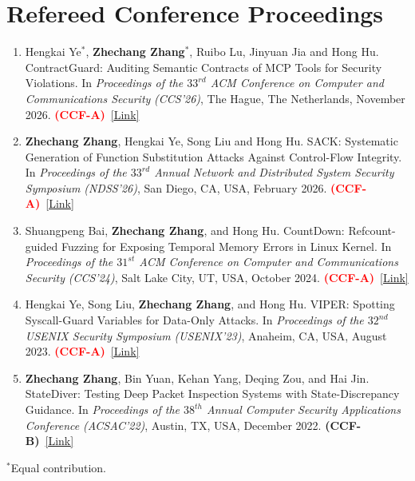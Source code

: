 \documentclass[letterpaper,10.8pt]{article}
\begin{document}
\section{Refereed Conference Proceedings}
\begin{enumerate}[leftmargin=*,label=\arabic*]
\item\label{pub:contractguard} Hengkai Ye$^*$, \textbf{Zhechang Zhang}$^*$, Ruibo Lu, Jinyuan Jia and Hong Hu. ContractGuard: Auditing Semantic Contracts of MCP Tools for Security Violations. In \textit{Proceedings of the $33^{rd}$ ACM Conference on Computer and Communications Security} \textsl{(CCS'26)}, The Hague, The Netherlands, November 2026. \textcolor{red}{\textbf{(CCF-A)}}~\href{https://www.sigsac.org/ccs/CCS2026/program/accepted-papers.html}{[\underline{Link}]}
\item\label{pub:sack} \textbf{Zhechang Zhang}, Hengkai Ye, Song Liu and Hong Hu. SACK: Systematic Generation of Function Substitution Attacks Against Control-Flow Integrity. In \textit{Proceedings of the $33^{rd}$ Annual Network and
Distributed System Security Symposium} \textsl{(NDSS'26)}, San Diego, CA, USA, February 2026. \textcolor{red}{\textbf{(CCF-A)}}~\href{https://www.ndss-symposium.org/ndss-paper/sack-systematic-generation-of-function-substitution-attacks-against-control-flow-integrity/}{[\underline{Link}]}
\item\label{pub:countdown} Shuangpeng Bai, \textbf{Zhechang Zhang}, and Hong Hu. CountDown: Refcount-guided Fuzzing for Exposing Temporal Memory Errors in Linux Kernel. In \textit{Proceedings of the $31^{st}$ ACM Conference on Computer and Communications Security} \textsl{(CCS'24)}, Salt Lake City, UT, USA, October 2024. \textcolor{red}{\textbf{(CCF-A)}}~\href{https://dl.acm.org/doi/10.1145/3658644.3690320}{[\underline{Link}]}
\item\label{pub:viper} Hengkai Ye, Song Liu, \textbf{Zhechang Zhang}, and Hong Hu. VIPER: Spotting Syscall-Guard Variables for Data-Only Attacks. In \textit{Proceedings of the $32^{nd}$ USENIX Security Symposium} \textsl{(USENIX'23)}, Anaheim, CA, USA, August 2023. \textcolor{red}{\textbf{(CCF-A)}}~\href{https://www.usenix.org/system/files/usenixsecurity23-ye.pdf}{[\underline{Link}]}
\item\label{pub:statediver} \textbf{Zhechang Zhang}, Bin Yuan, Kehan Yang, Deqing Zou, and Hai Jin. StateDiver: Testing Deep Packet Inspection Systems with State-Discrepancy Guidance. In \textit{Proceedings of the $38^{th}$ Annual Computer Security
Applications Conference} \textsl{(ACSAC'22)}, Austin, TX, USA, December 2022. \textbf{(CCF-B)}~\href{https://doi.org/10.1145/3564625.3564650}{[\underline{Link}]}
\end{enumerate}
$^*$Equal contribution.
\end{document}
